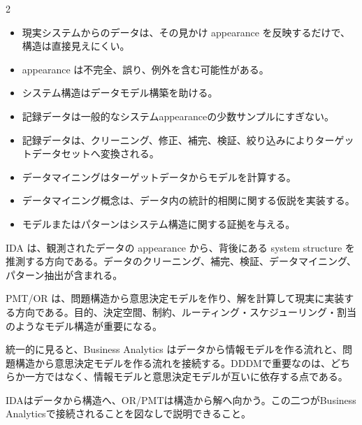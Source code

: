 \begin{multicols}{2}

\footnotesize

\raggedcolumns


\begin{itemize}
\item 現実システムからのデータは、その見かけ appearance を反映するだけで、構造は直接見えにくい。
\item appearance は不完全、誤り、例外を含む可能性がある。
\item システム構造はデータモデル構築を助ける。
\item 記録データは一般的なシステムappearanceの少数サンプルにすぎない。
\item 記録データは、クリーニング、修正、補完、検証、絞り込みによりターゲットデータセットへ変換される。
\item データマイニングはターゲットデータからモデルを計算する。
\item データマイニング概念は、データ内の統計的相関に関する仮説を実装する。
\item モデルまたはパターンはシステム構造に関する証拠を与える。
\end{itemize}

IDA は、観測されたデータの appearance から、背後にある system structure を推測する方向である。データのクリーニング、補完、検証、データマイニング、パターン抽出が含まれる。\par

PMT/OR は、問題構造から意思決定モデルを作り、解を計算して現実に実装する方向である。目的、決定空間、制約、ルーティング・スケジューリング・割当のようなモデル構造が重要になる。\par

統一的に見ると、Business Analytics はデータから情報モデルを作る流れと、問題構造から意思決定モデルを作る流れを接続する。DDDMで重要なのは、どちらか一方ではなく、情報モデルと意思決定モデルが互いに依存する点である。\par

IDAはデータから構造へ、OR/PMTは構造から解へ向かう。この二つがBusiness Analyticsで接続されることを図なしで説明できること。\par


\end{multicols}
